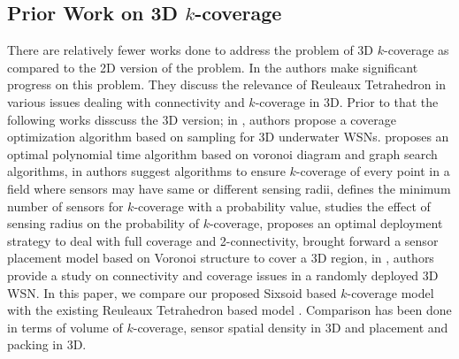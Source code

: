 \documentclass[conference]{IEEEtran}
\begin{document}
\subsection{Prior Work on 3D $k$-coverage}
There are relatively fewer works done to address the problem of 3D $k$-coverage as compared to the 2D version of the problem. In \cite{A,AD1} the authors make significant progress on this problem. They discuss the relevance of Reuleaux Tetrahedron in various issues dealing with connectivity and $k$-coverage in 3D. Prior to that the following works disscuss the 3D version; in \cite{XLL}, authors propose a coverage optimization algorithm based on sampling for 3D underwater WSNs. \cite{MKPS} proposes an optimal polynomial time algorithm based on voronoi diagram and graph search algorithms, in \cite{HT} authors suggest algorithms to ensure $k$-coverage of every point in a field  where sensors may have same or different sensing radii, \cite{KLB} defines the minimum number of sensors for $k$-coverage with a probability value, \cite{WY} studies the effect of sensing radius on the probability of $k$-coverage, \cite{BKXYL} proposes an optimal deployment strategy to deal with full coverage and 2-connectivity, \cite{AH} brought forward a sensor placement model based on Voronoi structure to cover a 3D region, in \cite{R}, authors provide a study on connectivity and coverage issues in a randomly deployed 3D WSN. In this paper, we compare our proposed Sixsoid based $k$-coverage model with the existing Reuleaux Tetrahedron based model \cite{A}. Comparison has been done in terms of volume of $k$-coverage, sensor spatial density in 3D and placement and packing in 3D. 
\end{document}
